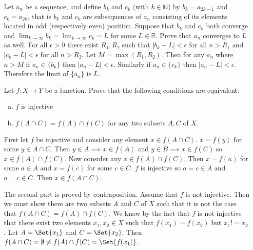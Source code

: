 \documentclass[paper=a4, fontsize=11pt]{jhwhw} %
\begin{document}
Let ${a_n}$ be a sequence, and define $b_k$ and $c_k$ (with $k\in \mathbb N$) by $b_k = a_{2k-1}$ and $c_k = a_{2k}$, that is ${b_k}$ and ${c_k}$ are subsequences of ${a_n}$ consisting of its elements located in odd (respectively even) position. Suppose that ${b_k}$ and ${c_k}$ both converge and $\lim_{k\to \infty}b_k = \lim_{k\to \infty}c_k = L$ for some $L\in \mathbb R$. Prove that ${a_n}$ converges to $L$ as well. 
\solution
For all $\epsilon > 0$ there exist $R_1, R_2$ such that $|b_k - L| < \epsilon$ for all $n > R_1$ and $|c_k - L| < \epsilon$ for all $n > R_2$. Let $M = \max(R_1, R_2)$. Then for any $a_n$ where $n > M$ if $a_n\in \{b_k\}$ then $|a_n - L| < \epsilon$. Similarly if $a_n\in \{c_k\}$ then $|a_n - L| < \epsilon$. Therefore the limit of $\{a_n\}$ is $L$.

Let $f: X\to Y$ be a function. Prove that the following conditions are equivalent:
\begin{enumerate}[(a)]
    \item $f$ is injective
    \item $f(A\cap C) = f(A)\cap f(C)$ for any two subsets $A, C$ of $X$.
\end{enumerate}
\solution
First let $f$ be injective and consider any element $x\in f(A\cap C)$. $x = f(y)$ for some $y\in A\cap C$. Then $y\in A\implies x\in f(A)$ and $y\in B\implies x\in f(C)$ so $x\in f(A)\cap f(C)$. Now consider any $x\in f(A)\cap f(C)$. Then $x = f(a)$ for some $a\in A$ and $x = f(c)$ for some $c\in C$. $f$ is injective so $a = c\in A$ and $a=c\in C$. Then $x\in f(A\cap C)$. 

The second part is proved by contraposition. Assume that $f$ is not injective. Then we must show there are two subsets $A$ and $C$ of $X$ such that it is not the case that $f(A\cap C) = f(A) \cap f(C)$. We know by the fact that $f$ is not injective that there exist two elements $x_1, x_2\in X$ such that $f(x_1) = f(x_2)$ but $x_1 != x_2$. Let $A=\Set{x_1}$ and $C = \Set{x_2}$. Then $f(A\cap C) = \emptyset \not= f(A) \cap f(C) = \Set{f(x_1)}$. 
\end{document}
